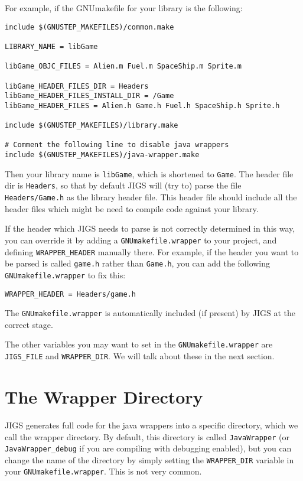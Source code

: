 For example, if the GNUmakefile for your library is the following:

\begin{verbatim}
include $(GNUSTEP_MAKEFILES)/common.make

LIBRARY_NAME = libGame

libGame_OBJC_FILES = Alien.m Fuel.m SpaceShip.m Sprite.m

libGame_HEADER_FILES_DIR = Headers
libGame_HEADER_FILES_INSTALL_DIR = /Game
libGame_HEADER_FILES = Alien.h Game.h Fuel.h SpaceShip.h Sprite.h

include $(GNUSTEP_MAKEFILES)/library.make

# Comment the following line to disable java wrappers
include $(GNUSTEP_MAKEFILES)/java-wrapper.make
\end{verbatim}

Then your library name is \texttt{libGame}, which is shortened to
\texttt{Game}.  The header file dir is \texttt{Headers}, so that 
by default JIGS will (try to) parse the file \texttt{Headers/Game.h}
as the library header file.  This header file should include all the
header files which might be need to compile code against your library.

If the header which JIGS needs to parse is not correctly determined in
this way, you can override it by adding a \texttt{GNUmakefile.wrapper}
to your project, and defining \texttt{WRAPPER\_HEADER} manually there.
For example, if the header you want to be parsed is called
\texttt{game.h} rather than \texttt{Game.h}, you can add the following 
\texttt{GNUmakefile.wrapper} to fix this: 
\begin{verbatim}
WRAPPER_HEADER = Headers/game.h
\end{verbatim}
The \texttt{GNUmakefile.wrapper} is automatically included (if present) 
by JIGS at the correct stage.

The other variables you may want to set in the
\texttt{GNUmakefile.wrapper} are \texttt{JIGS\_FILE} and
\texttt{WRAPPER\_DIR}.  We will talk about these in the next section.

\section{The Wrapper Directory}
JIGS generates full code for the java wrappers into a specific
directory, which we call the wrapper directory.  By default, this
directory is called \texttt{JavaWrapper} (or
\texttt{JavaWrapper\_debug} if you are compiling with debugging
enabled), but you can change the name of the directory by simply
setting the \texttt{WRAPPER\_DIR} variable in your
\texttt{GNUmakefile.wrapper}.  This is not very common.

